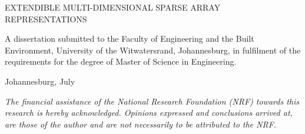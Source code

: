 \documentclass[MScDiss,altheaders,colorlinks,a4paper]{wits-eie-thesis}
\begin{document}
	
\begin{titlepage}
	\setcounter{page}{0}  %
	\vspace*{50pt}
	{\LARGE \bfseries \raggedright EXTENDIBLE MULTI-DIMENSIONAL SPARSE ARRAY REPRESENTATIONS \par} 
	\vspace*{40pt}
	\vspace*{\fill}{\large \scshape \centering \eeThDraft \par}
	\vspace{\fill}
	\ifx\@putlogo\@putlogotrue
	{
		\begin{center}\end{center}
	}
	\fi
	\vspace{\fill}
	{
		A dissertation submitted to the Faculty of Engineering and the Built Environment, University of the Witwatersrand, Johannesburg, in fulfilment of the requirements for the degree of Master of Science in Engineering.\par
		\vspace*{2em}
		Johannesburg, July
		
		\vspace*{1em}
		\normalsize
		\textit {The financial assistance of the National Research Foundation (NRF) towards this research is hereby acknowledged. Opinions expressed and conclusions arrived at, are those of the author and are not necessarily to be attributed to the NRF.}
	}
\end{titlepage}
	
\end{document}
